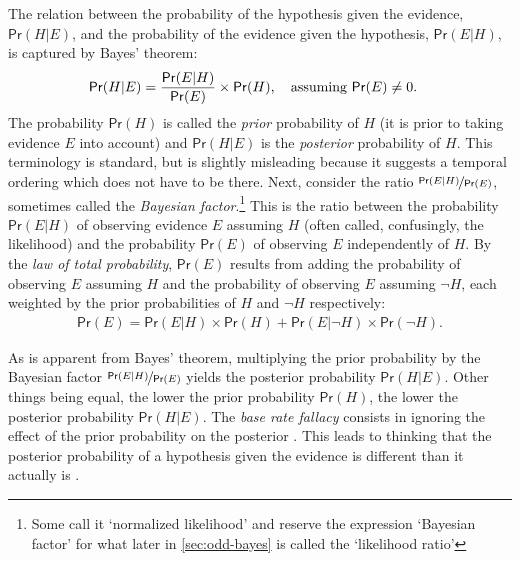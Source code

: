 \documentclass{article}
\newcommand{\pr}{\mathsf{Pr}}
\begin{document}
The relation between the probability of the hypothesis given the evidence, $\pr(H \vert E)$, and the probability of the evidence given the hypothesis, $\pr(E \vert H)$, is captured by   Bayes' theorem:
\begin{align*}\pr(H \vert E) & =  \frac{\pr(E \vert H)}{\pr(E)} \times \pr(H)\mbox{, \,\,\, assuming } \pr(E) \neq 0.\end{align*}
The probability $\pr(H)$ is called the \textit{prior} probability of $H$ (it is prior to taking  evidence $E$ into account) and $\pr(H\vert E)$ is the \emph{posterior} probability of $H$. This terminology is standard, but is slightly misleading because it suggests  a temporal ordering which does not have to be there. Next, consider the ratio $\nicefrac{\pr(E \vert H)}{\pr(E)} $, sometimes called the \textit{Bayesian factor}.\footnote{Some call it `normalized likelihood' and reserve the expression `Bayesian factor' for what later in \ref{sec:odd-bayes} is called the `likelihood ratio'} This is the ratio between the probability $\pr(E \vert H)$ of observing evidence $E$ assuming $H$ (often called, confusingly, the likelihood) and the probability $\pr(E)$ of observing $E$ independently of $H$. 
By the \emph{law of total probability}, $\pr(E)$ results from adding  the probability of observing $E$ assuming $H$  and the probability of  observing $E$ assuming $\neg H$, each weighted by the prior probabilities of $H$ and $\neg H$ respectively:  
\begin{align*}\pr(E)= \pr(E \vert H)\times \pr(H)+\pr(E \vert \neg H)\times \pr(\neg H).\end{align*}

 As is apparent from Bayes' theorem, multiplying the prior probability by the Bayesian factor $\nicefrac{\pr(E \vert H)}{\pr(E)}$  yields the posterior probability $\pr(H \vert E)$. 
Other things being equal, the lower the prior probability $\pr(H)$, the lower the posterior probability $\pr(H \vert E)$.
The \textit{base rate fallacy} consists in ignoring the effect of the prior probability on the posterior \citep{Kahneman1973}.
This leads to thinking that the posterior probability of a hypothesis given the evidence is different than it actually is  \citep{KoehlerBaseRate}. 
\end{document}
